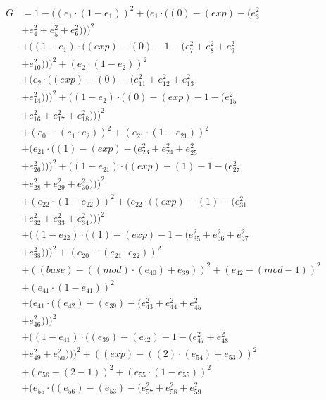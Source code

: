 \documentclass[10pt, a4paper]{article}
\begin{document}
\begin{small}
\begin{align*}
G &= 1 - ((e_{1}  \cdot  (1 - e_{1}))^{2} + (e_{1}  \cdot  ((0) - (exp) - (e_{3}^{2} \\
& + e_{4}^{2} + e_{5}^{2} + e_{6}^{2})))^{2} \\
& + ((1 - e_{1})  \cdot  ((exp) - (0) - 1 - (e_{7}^{2} + e_{8}^{2} + e_{9}^{2} \\
& + e_{10}^{2})))^{2} + (e_{2}  \cdot  (1 - e_{2}))^{2} \\
& + (e_{2}  \cdot  ((exp) - (0) - (e_{11}^{2} + e_{12}^{2} + e_{13}^{2} \\
& + e_{14}^{2})))^{2} + ((1 - e_{2})  \cdot  ((0) - (exp) - 1 - (e_{15}^{2} \\
& + e_{16}^{2} + e_{17}^{2} + e_{18}^{2})))^{2} \\
& + (e_{0} - (e_{1}  \cdot  e_{2}))^{2} + (e_{21}  \cdot  (1 - e_{21}))^{2} \\
& + (e_{21}  \cdot  ((1) - (exp) - (e_{23}^{2} + e_{24}^{2} + e_{25}^{2} \\
& + e_{26}^{2})))^{2} + ((1 - e_{21})  \cdot  ((exp) - (1) - 1 - (e_{27}^{2} \\
& + e_{28}^{2} + e_{29}^{2} + e_{30}^{2})))^{2} \\
& + (e_{22}  \cdot  (1 - e_{22}))^{2} + (e_{22}  \cdot  ((exp) - (1) - (e_{31}^{2} \\
& + e_{32}^{2} + e_{33}^{2} + e_{34}^{2})))^{2} \\
& + ((1 - e_{22})  \cdot  ((1) - (exp) - 1 - (e_{35}^{2} + e_{36}^{2} + e_{37}^{2} \\
& + e_{38}^{2})))^{2} + (e_{20} - (e_{21}  \cdot  e_{22}))^{2} \\
& + ((base) - ((mod)  \cdot  (e_{40}) + e_{39}))^{2} + (e_{42} - (mod - 1))^{2} \\
& + (e_{41}  \cdot  (1 - e_{41}))^{2} \\
& + (e_{41}  \cdot  ((e_{42}) - (e_{39}) - (e_{43}^{2} + e_{44}^{2} + e_{45}^{2} \\
& + e_{46}^{2})))^{2} \\
& + ((1 - e_{41})  \cdot  ((e_{39}) - (e_{42}) - 1 - (e_{47}^{2} + e_{48}^{2} \\
& + e_{49}^{2} + e_{50}^{2})))^{2} + ((exp) - ((2)  \cdot  (e_{54}) + e_{53}))^{2} \\
& + (e_{56} - (2 - 1))^{2} + (e_{55}  \cdot  (1 - e_{55}))^{2} \\
& + (e_{55}  \cdot  ((e_{56}) - (e_{53}) - (e_{57}^{2} + e_{58}^{2} + e_{59}^{2} \\

\end{align*}
\end{small}
\end{document}
